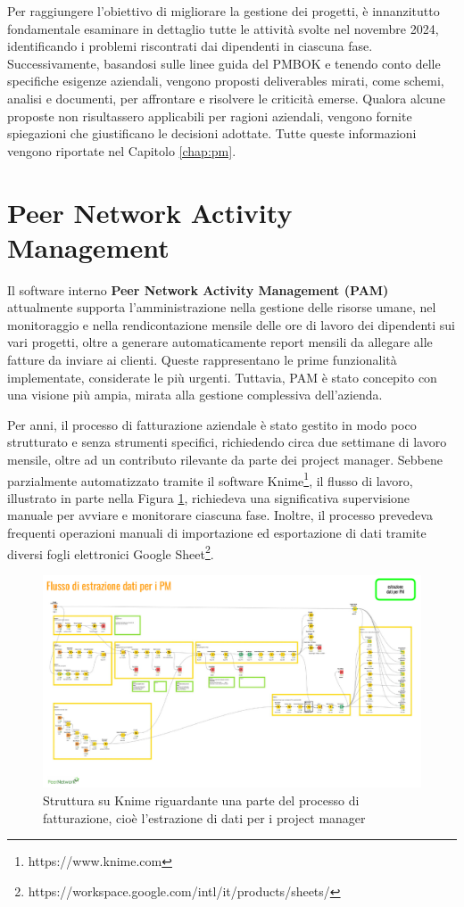 Per raggiungere l'obiettivo di migliorare la gestione dei progetti, è innanzitutto fondamentale esaminare in dettaglio tutte le attività svolte nel novembre 2024,
identificando i problemi riscontrati dai dipendenti in ciascuna fase. Successivamente, basandosi sulle linee guida del \ac{PMBOK} e tenendo conto delle specifiche
esigenze aziendali, vengono proposti deliverables mirati, come schemi, analisi e documenti, per affrontare e risolvere le criticità emerse. Qualora alcune proposte
non risultassero applicabili per ragioni aziendali, vengono fornite spiegazioni che giustificano le decisioni adottate. Tutte queste informazioni vengono riportate
nel Capitolo \ref{chap:pm}.

\section{Peer Network Activity Management}
Il software interno \textbf{Peer Network Activity Management (PAM)} attualmente supporta l’amministrazione nella gestione delle risorse umane, nel monitoraggio e nella rendicontazione mensile
delle ore di lavoro dei dipendenti sui vari progetti, oltre a generare automaticamente report mensili da allegare alle fatture da inviare ai clienti.
Queste rappresentano le prime funzionalità implementate, considerate le più urgenti. Tuttavia, \ac{PAM} è stato concepito con una visione più ampia, mirata
alla gestione complessiva dell'azienda.

Per anni, il processo di fatturazione aziendale è stato gestito in modo poco strutturato e senza strumenti specifici, richiedendo circa due settimane
di lavoro mensile, oltre ad un contributo rilevante da parte dei project manager. Sebbene parzialmente automatizzato tramite il software Knime\footnote{https://www.knime.com},
il flusso di lavoro, illustrato in parte nella Figura \ref{fig:fatturazione-knime}, richiedeva una significativa supervisione manuale per avviare e monitorare ciascuna fase.
Inoltre, il processo prevedeva frequenti operazioni manuali di importazione ed esportazione di dati tramite diversi fogli elettronici Google
Sheet\footnote{https://workspace.google.com/intl/it/products/sheets/}.

\begin{figure}
    \centering
    \includegraphics[width=\linewidth]{figures/FatturazioneKnime.pdf}
    \caption{Struttura su Knime riguardante una parte del processo di fatturazione, cioè l’estrazione di dati per i project manager}
    \label{fig:fatturazione-knime}
\end{figure}

